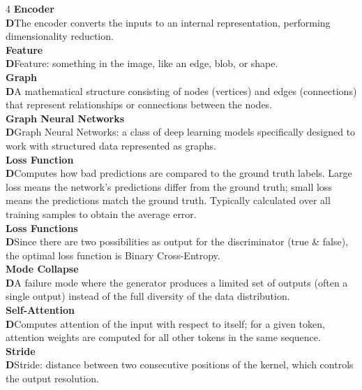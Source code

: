\documentclass[8pt]{extarticle}
\newcommand{\dtag}{\textcolor{definitioncolor}{\tiny\textbf{D}}\;}
\begin{document}
\begin{multicols}{4}
\vspace{2pt}\textbf{Encoder}\\
\dtag The encoder converts the inputs to an internal representation, performing dimensionality reduction.\\
\vspace{2pt}\textbf{Feature}\\
\dtag Feature: something in the image, like an edge, blob, or shape.\\
\vspace{2pt}\textbf{Graph}\\
\dtag A mathematical structure consisting of nodes (vertices) and edges (connections) that represent relationships or connections between the nodes.\\
\vspace{2pt}\textbf{Graph Neural Networks}\\
\dtag Graph Neural Networks: a class of deep learning models specifically designed to work with structured data represented as graphs.\\
\vspace{2pt}\textbf{Loss Function}\\
\dtag Computes how bad predictions are compared to the ground truth labels. Large loss means the network's predictions differ from the ground truth; small loss means the predictions match the ground truth. Typically calculated over all training samples to obtain the average error.\\
\vspace{2pt}\textbf{Loss Functions}\\
\dtag Since there are two possibilities as output for the discriminator (true \& false), the optimal loss function is Binary Cross-Entropy.\\
\vspace{2pt}\textbf{Mode Collapse}\\
\dtag A failure mode where the generator produces a limited set of outputs (often a single output) instead of the full diversity of the data distribution.\\
\vspace{2pt}\textbf{Self-Attention}\\
\dtag Computes attention of the input with respect to itself; for a given token, attention weights are computed for all other tokens in the same sequence.\\
\vspace{2pt}\textbf{Stride}\\
\dtag Stride: distance between two consecutive positions of the kernel, which controls the output resolution.\\

\end{multicols}
\end{document}

